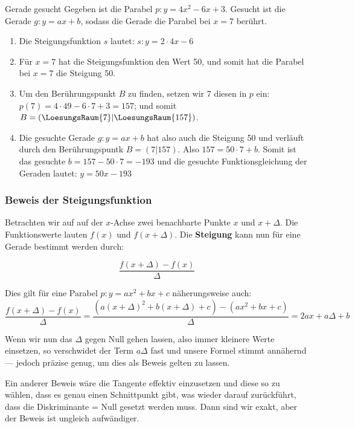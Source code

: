 \begin{beispiel}{Gerade gesucht}{}
Gegeben ist die Parabel $p: y=4x^2 -6x + 3$. Gesucht ist die Gerade
$g: y=ax+b$, sodass die Gerade die Parabel bei $x=7$ berührt.

\begin{enumerate}
\item Die Steigungsfunktion $s$ lautet: $s: y=2\cdot{}4x - 6$
\item Für $x=7$ hat die Steigungsfunktion den Wert 50, und somit hat
  die Parabel bei $x=7$ die Steigung 50.
\item Um den Berührungspunkt $B$ zu finden, setzen wir 7 diesen in $p$
  ein: $p(7)= 4\cdot{}49-6\cdot{}7+3 = 157$; und somit $B=(\LoesungsRaum{7}|\LoesungsRaum{157})$.
\item Die gesuchte Gerade $g: y=ax+b$ hat also auch die Steigung 50
  und verläuft durch den Berührungspuntk $B=(7|157)$. Also
  $157=50\cdot{}7+b$. Somit ist das gesuchte $b = 157-50\cdot{}7=-193$
  und die gesuchte Funktionsgleichung der Geraden lautet: $y = 50x-193$
  \end{enumerate}
\end{beispiel}
\newpage



\subsubsection{Beweis der Steigungsfunktion}

Betrachten wir auf auf der $x$-Achse zwei benachbarte Punkte $x$ und
$x+\Delta$. Die Funktionswerte lauten $f(x)$ und $f(x+\Delta)$. Die
\textbf{Steigung} kann nun für eine Gerade bestimmt werden durch:


$$\frac{f(x+\Delta) - f(x)}{\Delta}$$

Dies gilt für eine Parabel $p: y=ax^2+bx+c$ näherungsweise auch:
$$\frac{f(x+\Delta)-f(x)}{\Delta} = \frac{(a(x+\Delta)^2 + b(x+\Delta)
  + c) - (ax^2 + bx +c)}{\Delta}=2ax+a\Delta+b$$

Wenn wir nun das $\Delta$ gegen Null gehen lassen, also immer kleinere
Werte einsetzen, so verschwidet der Term $a\Delta$ fast und unsere
Formel stimmt annähernd --- jedoch präzise genug, um dies als Beweis
gelten zu lassen.

Ein anderer Beweis wäre die Tangente effektiv einzusetzen und diese so
zu wählen, dass es genau einen Schnittpunkt gibt, was wieder darauf
zurückführt, dass die Diskriminante = Null gesetzt werden muss. Dann
sind wir exakt, aber der Beweis ist ungleich aufwändiger.
\newpage

